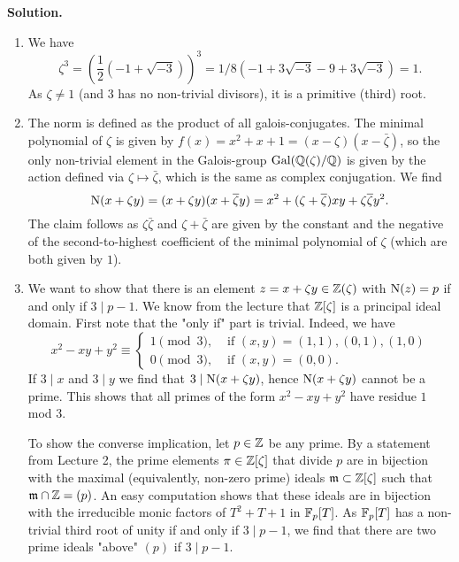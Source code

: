 \documentclass[a4paper,11pt]{article}
\begin{document}
\textbf{Solution.}
\begin{enumerate}
    \item We have 
        $$\zeta^3 = \left(\frac 12 (-1 + \sqrt{-3})\right)^3 = 1/8(-1 +
        3\sqrt{-3} - 9 + 3 \sqrt{-3}) = 1.$$ 
        As $\zeta \neq 1$ (and $3$ has no non-trivial
        divisors), it is a primitive (third) root. 
    \item The norm is defined as the product of all galois-conjugates. The minimal
        polynomial of $\zeta$ is given by $f(x) = x^2 + x + 1 = (x - \zeta)(x -
        \bar \zeta)$, so the only non-trivial element in the Galois-group
        $\operatorname{Gal}(\mathbb{Q}(\zeta)/\mathbb{Q})$ is given by the action defined via 
        $\zeta \mapsto \bar \zeta$, which is the same as complex conjugation. 
        We find 
        $$\operatorname{N}(x+\zeta y) = (x+\zeta y)(x + \overline \zeta y) = x^2 + (\zeta +
        \overline \zeta)xy + \zeta \overline \zeta y^2.$$
        The claim follows as $\zeta \bar \zeta$ and $\zeta + \bar \zeta$
        are given by the constant and the negative of the second-to-highest
        coefficient of the minimal polynomial of $\zeta$ (which are both given by
        $1$).
    \item We want to show that there is an element $z = x + \zeta y \in \mathbb{Z}(\zeta)$ 
        with $\operatorname{N}(z) = p$ if and only if $3 \mid p-1$. We know from the lecture
        that $\mathbb{Z}[\zeta]$ is a principal ideal domain. 
        First note that the "only if" part is trivial. Indeed, we have
        \begin{equation*}
            x^2 -xy + y^2 \equiv \begin{cases}
                1 \pmod 3, &\text{ if } (x,y) = (1,1), (0,1), (1,0)\\
                0 \pmod 3, &\text{ if } (x,y) = (0,0).
            \end{cases}
        \end{equation*}
        If $3 \mid x$ and $3 \mid y$ we find that $3 \mid \operatorname{N}(x+\zeta y)$,
        hence $\operatorname{N}(x+\zeta y)$ cannot be a prime. This shows that all primes
        of the form $x^2 -xy + y^2$ have residue $1$ mod $3$. 

        To show the converse implication, let $p \in \mathbb{Z}$ be any prime. 
        By a statement from Lecture 2, the prime elements $\pi \in \mathbb{Z}[\zeta]$
        that divide $p$ are in bijection with the maximal (equivalently,
        non-zero prime) ideals $\mathfrak{m} \subset \mathbb{Z}[\zeta]$ such that $\mathfrak{m} \cap \mathbb{Z} =
        (p)$. An easy computation shows that these ideals are in bijection
        with the irreducible monic factors of $T^2 + T + 1$ in 
        $\mathbb{F}_p[T]$. As $\mathbb{F}_p[T]$ has a non-trivial third root of unity if
        and only if $3 \mid p-1$, we find that there are 
        two prime ideals "above" $(p)$ if $3 \mid p-1$.


\end{enumerate}
\end{document}

